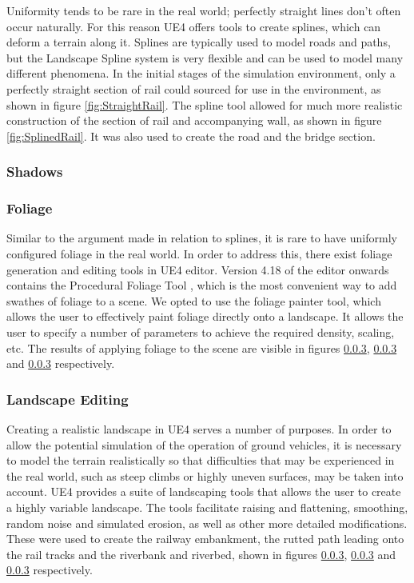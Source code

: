 Uniformity tends to be rare in the real world; perfectly straight lines don't often occur naturally. For this reason UE4 offers tools to create splines, which can deform a terrain along it. Splines are typically used to model roads and paths, but the Landscape Spline system is very flexible and can be used to model many different phenomena. In the initial stages of the simulation environment, only a perfectly straight section of rail could sourced for use in the environment, as shown in figure \ref{fig:StraightRail}. The spline tool allowed for much more realistic construction of the section of rail and accompanying wall, as shown in figure \ref{fig:SplinedRail}. It was also used to create the road and the bridge section. 



\subsubsection{Shadows}

\subsubsection{Foliage}
Similar to the argument made in relation to splines, it is rare to have uniformly configured foliage in the real world. In order to address this, there exist foliage generation and editing tools in UE4 editor. Version 4.18 of the editor onwards contains the Procedural Foliage Tool , which is the most convenient way to add swathes of foliage to a scene. We opted to use the foliage painter tool, which allows the user to effectively paint foliage directly onto a landscape. It allows the user to specify a number of parameters to achieve the required density, scaling, etc. The results of applying foliage to the scene are visible in figures \ref{}, \ref{} and \ref{} respectively.



\subsubsection{Landscape Editing}
Creating a realistic landscape in UE4 serves a number of purposes. In order to allow the potential simulation of the operation of ground vehicles, it is necessary to model the terrain realistically so that difficulties that may be experienced in the real world, such as steep climbs or highly uneven surfaces, may be taken into account. UE4 provides a suite of landscaping tools that allows the user to create a highly variable landscape. The tools facilitate raising and flattening, smoothing, random noise and simulated erosion, as well as other more detailed modifications. These were used to create the railway embankment, the rutted path leading onto the rail tracks and the riverbank and riverbed, shown in figures \ref{}, \ref{} and \ref{} respectively.


